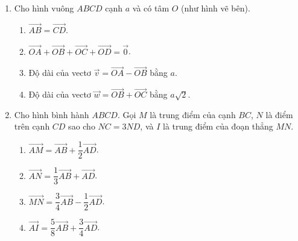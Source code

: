 \documentclass[10pt,a4paper]{article}
\begin{document}
\begin{enumerate}
\item Cho hình vuông $ABCD$ cạnh $a$ và có tâm $O$ (như hình vẽ bên).
\par\noindent\begin{minipage}[t]{0.72\linewidth}
\begin{enumerate}
    \item $\vec{AB} = \vec{CD}$.
    \item $\vec{OA} + \vec{OB} + \vec{OC} + \vec{OD} = \vec{0}$.
    \item Độ dài của vectơ $\vec{v} = \vec{OA} - \vec{OB}$ bằng $a$.
    \item Độ dài của vectơ $\vec{w} = \vec{OB} + \vec{OC}$ bằng $a\sqrt{2}$.
\end{enumerate}
\end{minipage}\hfill
\begin{minipage}[t]{0.26\linewidth}\raggedleft\vspace{-6pt}
\end{minipage}

\item Cho hình bình hành $ABCD$. Gọi $M$ là trung điểm của cạnh $BC$, $N$ là điểm trên cạnh $CD$ sao cho $NC = 3ND$, và $I$ là trung điểm của đoạn thẳng $MN$.
\begin{enumerate}
    \item $\vec{AM} = \vec{AB} + \dfrac{1}{2}\vec{AD}$.
    \item $\vec{AN} = \dfrac{1}{3}\vec{AB} + \vec{AD}$.
    \item $\vec{MN} = \dfrac{3}{4}\vec{AB} - \dfrac{1}{2}\vec{AD}$.
    \item $\vec{AI} = \dfrac{5}{8}\vec{AB} + \dfrac{3}{4}\vec{AD}$.
\end{enumerate}


\end{enumerate}
\end{document}
